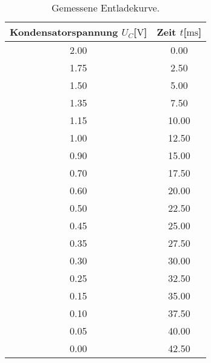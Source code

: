     \begin{table}
        \centering
        \caption{Gemessene Entladekurve.}
        \label{tab:entladen}
        \begin{tabular}{c c}
            \toprule
            Kondensatorspannung $U_{C}$[$\si{\volt}$] & Zeit $t$[$\si{\milli\second}$] \\
            \midrule
            2.00    &   0.00\\   
            1.75    &   2.50\\  
            1.50    &   5.00\\
            1.35    &   7.50\\  
            1.15    &   10.00\\
            1.00    &   12.50\\
            0.90    &   15.00\\
            0.70    &   17.50\\
            0.60    &   20.00\\
            0.50    &   22.50\\
            0.45    &   25.00\\
            0.35    &   27.50\\
            0.30    &   30.00\\
            0.25    &   32.50\\  
            0.15    &   35.00\\
            0.10    &   37.50\\
            0.05    &   40.00\\
            0.00    &   42.50\\
            \bottomrule
        \end{tabular}
        \end{table}
